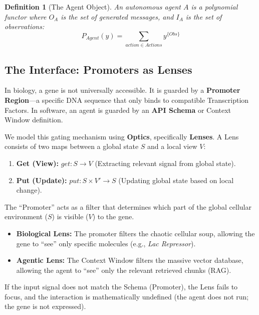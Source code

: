 \documentclass[11pt, a4paper]{article}
\newtheorem{definition}{Definition}
\begin{document}
\begin{definition}[The Agent Object]
An autonomous agent $A$ is a polynomial functor where $O_A$ is the set of generated messages, and $I_A$ is the set of observations:
\begin{equation}
    P_{Agent}(y) = \sum_{action \in Actions} y^{\{Obs\}}
\end{equation}
\end{definition}


\subsection{The Interface: Promoters as Lenses}

In biology, a gene is not universally accessible. It is guarded by a \textbf{Promoter Region}---a specific DNA sequence that only binds to compatible Transcription Factors. In software, an agent is guarded by an \textbf{API Schema} or Context Window definition.

We model this gating mechanism using \textbf{Optics}, specifically \textbf{Lenses}. A Lens consists of two maps between a global state $S$ and a local view $V$:
\begin{enumerate}
    \item \textbf{Get (View):} $get: S \to V$ (Extracting relevant signal from global state).
    \item \textbf{Put (Update):} $put: S \times V' \to S$ (Updating global state based on local change).
\end{enumerate}

The ``Promoter'' acts as a filter that determines which part of the global cellular environment ($S$) is visible ($V$) to the gene.
\begin{itemize}
    \item \textbf{Biological Lens:} The promoter filters the chaotic cellular soup, allowing the gene to ``see'' only specific molecules (e.g., \textit{Lac Repressor}).
    \item \textbf{Agentic Lens:} The Context Window filters the massive vector database, allowing the agent to ``see'' only the relevant retrieved chunks (RAG).
\end{itemize}

If the input signal does not match the Schema (Promoter), the Lens fails to focus, and the interaction is mathematically undefined (the agent does not run; the gene is not expressed).
\end{document}
